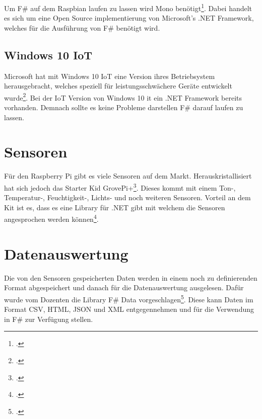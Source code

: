 Um F\# auf dem Raspbian laufen zu lassen wird Mono benötigt\footcite{Mono_2016-04-24}. Dabei handelt es sich um eine Open Source implementierung von Microsoft's .NET Framework, welches für die Ausführung von F\# benötigt wird.

\subsection{Windows 10 IoT}
Microsoft hat mit Windows 10 IoT eine Version ihres Betriebsystem herausgebracht, welches speziell für leistungsschwächere Geräte entwickelt wurde\footcite{Windows_IoT_2016-04-24}. Bei der IoT Version von Windows 10 it ein .NET Framework bereits vorhanden. Demnach sollte es keine Probleme darstellen F\# darauf laufen zu lassen.

\section{Sensoren}
Für den Raspberry Pi gibt es viele Sensoren auf dem Markt. Herauskristallisiert hat sich jedoch das Starter Kid GrovePi+\footcite{GrovePi_2016-04-24}. Dieses kommt mit einem Ton-, Temperatur-, Feuchtigkeit-, Lichts- und noch weiteren Sensoren. Vorteil an dem Kit ist es, dass es eine Library für .NET gibt mit welchem die Sensoren angesprochen werden können\footcite{NuGet_GrovePi_2016-04-24}.

\section{Datenauswertung}
Die von den Sensoren gespeicherten Daten werden in einem noch zu definierenden Format abgespeichert und danach für die Datenauswertung ausgelesen. Dafür wurde vom Dozenten die Library F# Data vorgeschlagen\footcite{Fsharp_Data_2016-04-24}. Diese kann Daten im Format CSV, HTML, JSON und XML entgegennehmen und für die Verwendung in F\# zur Verfügung stellen.
